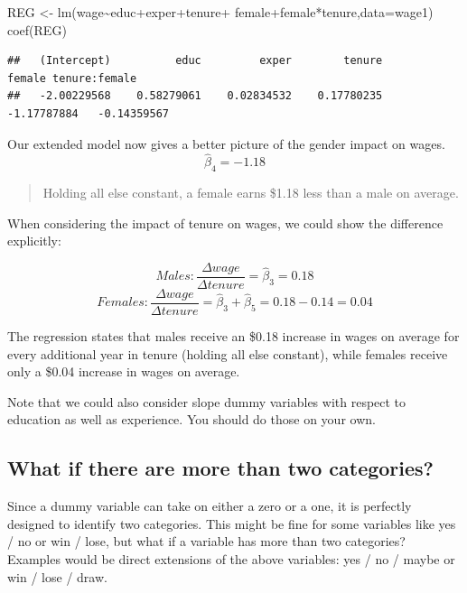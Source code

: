 \documentclass[
]{book}
\newenvironment{Shaded}{\begin{snugshade}}{\end{snugshade}}
\newcommand{\AttributeTok}[1]{\textcolor[rgb]{0.77,0.63,0.00}{#1}}
\newcommand{\FunctionTok}[1]{\textcolor[rgb]{0.00,0.00,0.00}{#1}}
\newcommand{\NormalTok}[1]{#1}
\newcommand{\OtherTok}[1]{\textcolor[rgb]{0.56,0.35,0.01}{#1}}
\newcommand{\SpecialCharTok}[1]{\textcolor[rgb]{0.00,0.00,0.00}{#1}}
\begin{document}
\begin{Shaded}
\begin{Highlighting}[]
\NormalTok{REG }\OtherTok{\textless{}{-}} \FunctionTok{lm}\NormalTok{(wage}\SpecialCharTok{\textasciitilde{}}\NormalTok{educ}\SpecialCharTok{+}\NormalTok{exper}\SpecialCharTok{+}\NormalTok{tenure}\SpecialCharTok{+}
\NormalTok{            female}\SpecialCharTok{+}\NormalTok{female}\SpecialCharTok{*}\NormalTok{tenure,}\AttributeTok{data=}\NormalTok{wage1)}
\FunctionTok{coef}\NormalTok{(REG)}
\end{Highlighting}
\end{Shaded}

\begin{verbatim}
##   (Intercept)          educ         exper        tenure        female tenure:female 
##   -2.00229568    0.58279061    0.02834532    0.17780235   -1.17787884   -0.14359567
\end{verbatim}

Our extended model now gives a better picture of the gender impact on wages.
\[\hat{\beta}_4 = -1.18\]

\begin{quote}
Holding all else constant, a female earns \$1.18 less than a male on average.
\end{quote}

When considering the impact of tenure on wages, we could show the difference explicitly:

\[Males: \frac{\Delta wage}{\Delta tenure} = \hat{\beta}_3=0.18\]
\[Females: \frac{\Delta wage}{\Delta tenure} = \hat{\beta}_3+\hat{\beta}_5=0.18-0.14=0.04\]

The regression states that males receive an \$0.18 increase in wages on average for every additional year in tenure (holding all else constant), while females receive only a \$0.04 increase in wages on average.

Note that we could also consider slope dummy variables with respect to education as well as experience. You should do those on your own.

\hypertarget{what-if-there-are-more-than-two-categories}{%
\subsection{What if there are more than two categories?}\label{what-if-there-are-more-than-two-categories}}

Since a dummy variable can take on either a zero or a one, it is perfectly designed to identify two categories. This might be fine for some variables like yes / no or win / lose, but what if a variable has more than two categories? Examples would be direct extensions of the above variables: yes / no / maybe or win / lose / draw.
\end{document}
